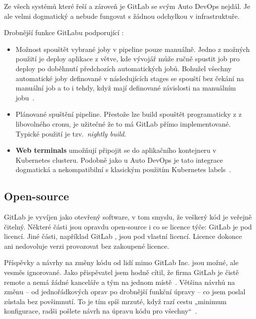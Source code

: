         Ze všech systémů které řeší \CI a zároveň \CD je GitLab se svým Auto DevOps nejdál. Je ale velmi dogmatický a nebude fungovat s žádnou odchylkou v infrastruktuře.

        Drobnější funkce GitLabu podporující \CD:
        \begin{itemize}
            \item Možnost spouštět vybrané joby v pipeline pouze manuálně. Jedno z možných použití je deploy aplikace z  větve, kde vývojář může ručně spustit job pro deploy po doběhnutí předchozích automatických jobů. Bohužel všechny automatické joby definované v následujících stages se spouští bez čekání na manuální job a to i tehdy, když mají definované závislosti na manuálním jobu~\cite{gitlab-issue-manual-job}.
            \item Plánované spuštění pipeline. Přestože lze build spouštět programaticky z  z libovolného cronu, je užitečné že to má GitLab přímo implementované. Typické použití je tzv.~\textit{nightly build}.
            \item \textbf{Web terminals} umožňují připojit se do aplikačního kontejneru v Kubernetes clusteru. Podobně jako u Auto DevOps je tato integrace dogmatická a nekompatibilní s klasickým použitím Kubernetes labels~\cite{gitlab-issue-k8s-deploy}.
        \end{itemize}

    \subsection{Open-source}
        GitLab je vyvíjen jako otevřený software, v tom smyslu, že veškerý kód je veřejně čitelný. Některé části jsou opravdu open-source i co se licence týče: GitLab  je pod  licencí. Jiné části, například GitLab , jsou pod vlastní licencí. Licence dokonce ani nedovoluje  verzi provozovat bez zakoupené licence.

        Příspěvky a návrhy na změny kódu od lidí mimo GitLab Inc. jsou možné, ale vesměs ignorované. Jako přispěvatel jsem hodně cítil, že firma GitLab je čistě remote a nemá žádné kanceláře a tým na jednom místě~\cite{gitlab-team}. Většina návrhů na změnu -- od jednořádkových oprav po drobnější funkční úpravy -- co jsem poslal zůstala bez povšimnutí. To je tím spíš mrzuté, když razí cestu „minimum konfigurace, radši pošlete návrh na úpravu kódu pro všechny“~\cite{gitlab-no-custom}.


